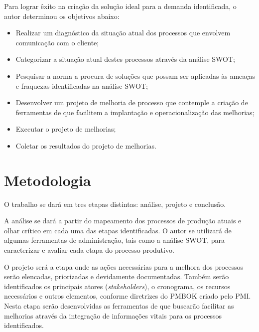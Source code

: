 Para lograr êxito na criação da solução ideal para a demanda identificada, o autor determinou os objetivos abaixo:

\begin{itemize}

\item Realizar um diagnóstico da situação atual dos processos que envolvem comunicação com o cliente;

\item Categorizar a situação atual destes processos através da análise SWOT\footnotemark;


\item Pesquisar a norma \iso a procura de soluções que possam ser aplicadas às ameaças e fraquezas identificadas na análise SWOT;

\item Desenvolver um projeto de melhoria de processo que contemple a criação de ferramentas de \sw que facilitem a implantação e operacionalização das melhorias;

\item Executar o projeto de melhorias;

\item Coletar os resultados do projeto de melhorias.

\end{itemize}

\section{Metodologia}

O trabalho se dará em tres etapas distintas: análise, projeto e conclusão.

A análise se dará a partir do mapeamento dos processos de produção atuais e olhar crítico em cada uma das etapas identificadas. O autor se utilizará de algumas ferramentas de administração, tais como a análise SWOT, para caracterizar e avaliar cada etapa do processo produtivo.

O projeto será a etapa onde as ações necessárias para a melhora dos processos serão elencadas, priorizadas e devidamente documentadas. Também serão identificados os principais atores (\textit{stakeholders}), o cronograma, os recursos necessários e outros elementos, conforme diretrizes do PMBOK\footnotemark{} criado pelo PMI\footnotemark. Nesta etapa serão desenvolvidas as ferramentas de \sw que buscarão facilitar as melhorias através da integração de informações vitais para os processos identificados.


